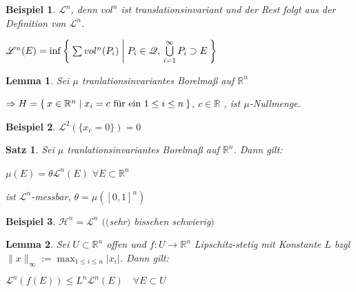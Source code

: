 \documentclass[11pt]{memoir}
\theoremstyle{changebreak}
\newtheorem{Beispiel}{Beispiel}[chapter]
\newtheorem{Lemma}{Lemma}[chapter]
\newtheorem{Satz}{Satz}[chapter]
\begin{document}
\begin{Beispiel}
$\mathscr L^n$, denn $vol^n$ ist translationsinvariant und der Rest folgt aus der Definition von $\mathscr L^n$. \\
\begin{center}
	$\mathscr L^n(E) = \inf\Set{ \sum vol^n(P_i) | P_i \in \mathscr Q, \,\bigcup\limits_{i=1}^\infty P_i \supset E }$
\end{center}
\end{Beispiel}


\begin{Lemma}
Sei $\mu$ tranlationsinvariantes Borelmaß auf $\mathbb R^n$
\begin{center}
	$\Rightarrow H = \Set{ x \in \mathbb R^n | x_i = c \text{ für ein } 1\leq i \leq n}$, $c \in \mathbb R$ , ist $\mu$-Nullmenge.
\end{center}
\end{Lemma}

\begin{Beispiel}
$\mathscr L^2(\{x_c = 0\}) = 0$
\end{Beispiel}

\begin{Satz}
Sei $\mu$ tranlationsinvariantes Borelmaß auf $\mathbb R^n$. Dann gilt:
\begin{center}
	$\mu(E) = \theta \mathscr L^n(E)$ $ \forall E \subset \mathbb R^n$
\end{center}
ist $\mathscr L^n$-messbar, $\theta = \mu([0, 1]^n)$
\end{Satz}

\begin{Beispiel}
$\mathscr H^n = \mathscr L^n$ $(($sehr$)$ bisschen schwierig$)$
\end{Beispiel}

\begin{Lemma}
Sei $U \subset \mathbb R^n$ offen und $f: U \rightarrow \mathbb R^n$ Lipschitz-stetig mit Konstante $L$ bzgl $\|x\|_\infty := \max_{1 \leq i \leq n} |x_i |$. Dann gilt:
\begin{center}
	$\mathscr L^n(f(E)) \leq L^n \mathscr L^n (E)\quad \forall E \subset U$
\end{center}
\end{Lemma}
\end{document}
